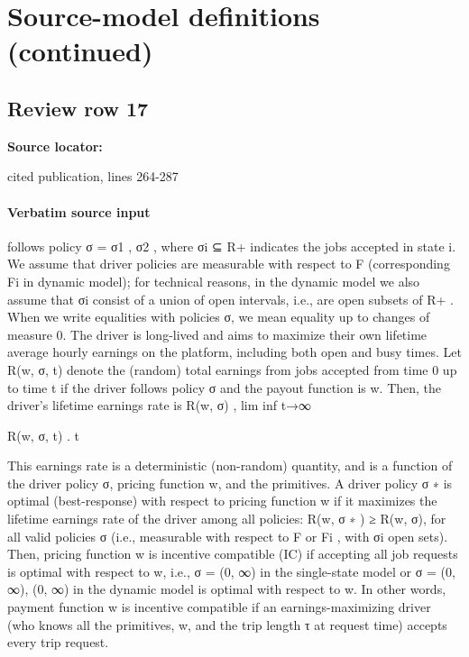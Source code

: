 \documentclass[10pt]{article}
\begin{document}
\section*{Source-model definitions (continued)}
\subsection*{Review row 17}
\textbf{Source locator:} {\footnotesize\raggedright cited publication, lines 264-\allowbreak{}287\par}
\paragraph{Verbatim source input}
\begin{ReviewVerbatim}
follows policy σ = {σ1 , σ2 }, where σi ⊆ R+ indicates the jobs accepted in state i. We assume that
driver policies are measurable with respect to F (corresponding Fi in dynamic model); for technical
reasons, in the dynamic model we also assume that σi consist of a union of open intervals, i.e., are
open subsets of R+ . When we write equalities with policies σ, we mean equality up to changes of
measure 0.
The driver is long-lived and aims to maximize their own lifetime average hourly earnings on the
platform, including both open and busy times. Let R(w, σ, t) denote the (random) total earnings
from jobs accepted from time 0 up to time t if the driver follows policy σ and the payout function
is w. Then, the driver’s lifetime earnings rate is
R(w, σ) , lim inf t→∞

R(w, σ, t)
.
t

This earnings rate is a deterministic (non-random) quantity, and is a function of the driver policy
σ, pricing function w, and the primitives.
A driver policy σ ∗ is optimal (best-response) with respect to pricing function w if it maximizes
the lifetime earnings rate of the driver among all policies: R(w, σ ∗ ) ≥ R(w, σ), for all valid policies
σ (i.e., measurable with respect to F or Fi , with σi open sets). Then, pricing function w is incentive
compatible (IC) if accepting all job requests is optimal with respect to w, i.e., σ = (0, ∞) in
the single-state model or σ = {(0, ∞), (0, ∞)} in the dynamic model is optimal with respect to w.
In other words, payment function w is incentive compatible if an earnings-maximizing driver (who
knows all the primitives, w, and the trip length τ at request time) accepts every trip request.
\end{ReviewVerbatim}
\end{document}
